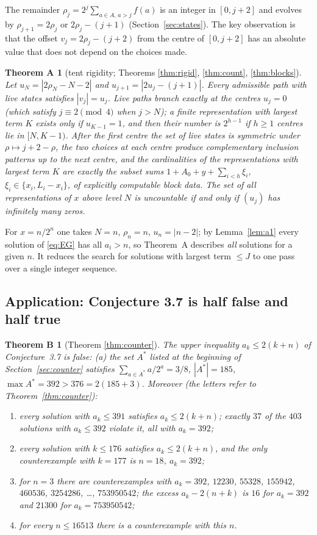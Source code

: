 \documentclass[11pt]{amsart}
\newtheorem*{theoremA}{Theorem A}
\newtheorem*{theoremB}{Theorem B}
\theoremstyle{definition}
\theoremstyle{remark}
\begin{document}
The remainder $\rho_j=2^j\sum_{a\in A,\,a>j}f(a)$ is an integer in $[0,j+2]$ and evolves by $\rho_{j+1}=2\rho_j$ or $2\rho_j-(j+1)$ (Section~\ref{sec:states}). The key observation is that the offset $v_j=2\rho_j-(j+2)$ from the centre of $[0,j+2]$ has an absolute value that does not depend on the choices made.

\begin{theoremA}[tent rigidity; Theorems \ref{thm:rigid}, \ref{thm:count}, \ref{thm:blocks}]
Let $u_N=|2\rho_N-N-2|$ and $u_{j+1}=|2u_j-(j+1)|$. Every admissible path with live states satisfies $|v_j|=u_j$. Live paths branch exactly at the \emph{centres} $u_j=0$ (which satisfy $j\equiv2\pmod4$ when $j>N$); a finite representation with largest term $K$ exists only if $u_{K-1}=1$, and then their number is $2^{h-1}$ if $h\ge1$ centres lie in $[N,K-1)$. After the first centre the set of live states is symmetric under $\rho\mapsto j+2-\rho$, the two choices at each centre produce complementary inclusion patterns up to the next centre, and the cardinalities of the representations with largest term $K$ are exactly the subset sums $1+A_0+y+\sum_{i<h}\xi_i$, $\xi_i\in\{x_i,L_i-x_i\}$, of explicitly computable block data. The set of all representations of $x$ above level $N$ is uncountable if and only if $(u_j)$ has infinitely many zeros.
\end{theoremA}

For $x=n/2^n$ one takes $N=n$, $\rho_n=n$, $u_n=|n-2|$; by Lemma~\ref{lem:a1} every solution of \eqref{eq:EG} has all $a_i>n$, so Theorem~A describes \emph{all} solutions for a given $n$. It reduces the search for solutions with largest term $\le J$ to one pass over a single integer sequence.

\subsection*{Application: Conjecture 3.7 is half false and half true}

\begin{theoremB}[Theorem \ref{thm:counter}]
The upper inequality $a_k\le 2(k+n)$ of Conjecture~3.7 is false: \textup{(a)} the set $A^*$ listed at the beginning of Section~\ref{sec:counter} satisfies $\sum_{a\in A^*}a/2^a=3/8$, $|A^*|=185$, $\max A^*=392>376=2(185+3)$. Moreover \textup{(}the letters refer to Theorem~\ref{thm:counter}\textup{)}:
\begin{enumerate}[label=\textup{(\alph*)},start=2]
\item every solution with $a_k\le 391$ satisfies $a_k\le 2(k+n)$; exactly $37$ of the $403$ solutions with $a_k\le392$ violate it, all with $a_k=392$;
\item every solution with $k\le 176$ satisfies $a_k\le 2(k+n)$, and the only counterexample with $k=177$ is $n=18$, $a_k=392$;
\item for $n=3$ there are counterexamples with $a_k=392$, $12230$, $55328$, $155942$, $460536$, $3254286$, \dots, $753950542$; the excess $a_k-2(n+k)$ is $16$ for $a_k=392$ and $21300$ for $a_k=753950542$;
\item for every $n\le 16513$ there is a counterexample with this $n$.
\end{enumerate}
\end{theoremB}
\end{document}
